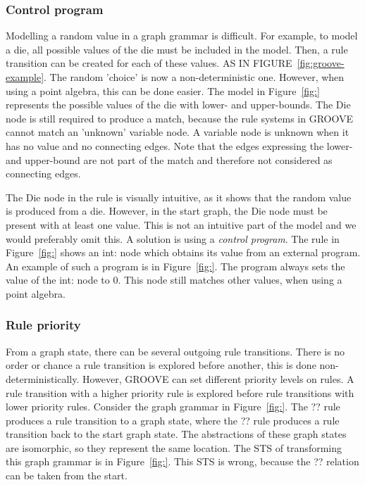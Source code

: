 \subsubsection{Control program}
Modelling a random value in a graph grammar is difficult. For example, to model a die, all possible values of the die must be included in the model. Then, a rule transition can be created for each of these values. AS IN FIGURE~\ref{fig:groove-example}. The random 'choice' is now a non-deterministic one. However, when using a point algebra, this can be done easier. The model in Figure~\ref{fig:} represents the possible values of the die with lower- and upper-bounds. The Die node is still required to produce a match, because the rule systems in GROOVE cannot match an 'unknown' variable node. A variable node is unknown when it has no value and no connecting edges. Note that the edges expressing the lower- and upper-bound are not part of the match and therefore not considered as connecting edges.

The Die node in the rule is visually intuitive, as it shows that the random value is produced from a die. However, in the start graph, the Die node must be present with at least one value. This is not an intuitive part of the model and we would preferably omit this. A solution is using a \textit{control program}. The rule in Figure~\ref{fig:} shows an int: node which obtains its value from an external program. An example of such a program is in Figure~\ref{fig:}. The program always sets the value of the int: node to 0. This node still matches other values, when using a point algebra.

\subsubsection{Rule priority}
From a graph state, there can be several outgoing rule transitions. There is no order or chance a rule transition is explored before another, this is done non-deterministically. However, GROOVE can set different priority levels on rules. A rule transition with a higher priority rule is explored before rule transitions with lower priority rules. Consider the graph grammar in Figure~\ref{fig:}. The ?? rule produces a rule transition to a graph state, where the ?? rule produces a rule transition back to the start graph state. The abstractions of these graph states are isomorphic, so they represent the same location. The STS of transforming this graph grammar is in Figure~\ref{fig:}. This STS is wrong, because the ?? relation can be taken from the start. 

